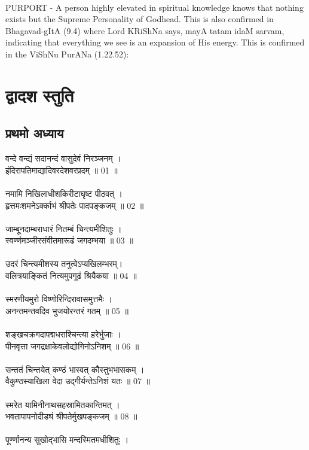 \\
PURPORT - A person highly elevated in spiritual knowledge knows that nothing exists but the Supreme Personality of Godhead. This is also confirmed in Bhagavad-gItA (9.4) where Lord KRiShNa says, mayA tatam idaM sarvam, indicating that everything we see is an expansion of His energy. This is confirmed in the ViShNu PurANa (1.22.52):\\

\section{\sanskrit द्वादश स्तुति}
\subsection{\sanskrit प्रथमो अध्याय}
\sanskrit
वन्दे वन्द्यं सदानन्दं वासुदेवं निरञ्जनम् ।\\
इंदिरापतिमाद्यादिवरदेशवरप्रदम् ॥ 01 ॥\\
\\
नमामि निखिलाधीशकिरीटाघृष्ट पीठवत् ।\\
हृत्तमःशमनेऽर्क्काभं श्रीपतेः पादपङ्कजम् ॥ 02 ॥\\
\\
जाम्बूनदाम्बराधारं नितम्बं चिन्त्यमीशितुः ।\\
स्वर्ण्णमञ्जीरसंवीतमारूढं जगदम्भया ॥ 03 ॥\\
\\
उदरं चिन्त्यमीशस्य तनुत्वेऽप्यखिलम्भरम्।\\
वलित्रयाङ्कितं नित्यमुपगूढं श्रियैकया ॥ 04 ॥\\
\\
 स्मरणीयमुरो विष्णोरिन्दिरावासमुत्तमैः ।\\
अनन्तमन्तवदिव भुजयोरन्तरं गतम् ॥ 05 ॥\\
\\
 शङ्खचक्रगदापद्मधराश्चिन्त्या हरेर्भुजाः ।\\
पीनवृत्ता जगद्रक्षाकेवलोद्योगिनोऽनिशम् ॥ 06 ॥\\
\\
सन्ततं चिन्तयेत् कण्ठं भास्वत् कौस्तुभभासकम् ।\\
वैकुण्ठस्याखिला वेदा उद्गीर्यन्तेऽनिशं यतः ॥ 07 ॥\\
\\
स्मरेत यामिनीनाथसहस्रामितकान्तिमत् ।\\
भवतापापनोदीड्यं श्रीपतेर्मुखपङ्कजम् ॥ 08 ॥\\
\\
पूर्ण्णानन्य सुखोद्भासि मन्दस्मितमधीशितुः ।\\
